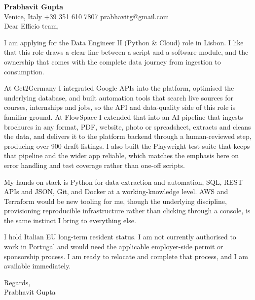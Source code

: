 \documentclass[a4paper,10.5pt]{article}
\begin{document}
\textbf{Prabhavit Gupta}\\
Venice, Italy \textbar{} +39 351 610 7807 \textbar{} prabhavitg@gmail.com\\[10pt]
Dear Efficio team,

I am applying for the Data Engineer II (Python \& Cloud) role in Lisbon. I like that this role draws a clear line between a script and a software module, and the ownership that comes with the complete data journey from ingestion to consumption.

At Get2Germany I integrated Google APIs into the platform, optimised the underlying database, and built automation tools that search live sources for courses, internships and jobs, so the API and data-quality side of this role is familiar ground. At FlowSpace I extended that into an AI pipeline that ingests brochures in any format, PDF, website, photo or spreadsheet, extracts and cleans the data, and delivers it to the platform backend through a human-reviewed step, producing over 900 draft listings. I also built the Playwright test suite that keeps that pipeline and the wider app reliable, which matches the emphasis here on error handling and test coverage rather than one-off scripts.

My hands-on stack is Python for data extraction and automation, SQL, REST APIs and JSON, Git, and Docker at a working-knowledge level. AWS and Terraform would be new tooling for me, though the underlying discipline, provisioning reproducible infrastructure rather than clicking through a console, is the same instinct I bring to everything else.

I hold Italian EU long-term resident status. I am not currently authorised to work in Portugal and would need the applicable employer-side permit or sponsorship process. I am ready to relocate and complete that process, and I am available immediately.

Regards,\\
Prabhavit Gupta
\end{document}

